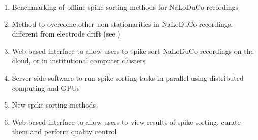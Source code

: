 \begin{enumerate}
    \item Benchmarking of offline spike sorting methods for NaLoDuCo recordings
    \item Method to overcome other non-stationarities in NaLoDuCo recordings, different from electrode drift (see )
    \item Web-based interface to allow users to spike sort NaLoDuCo recordings on the cloud, or in institutional computer clusters
    \item Server side software to run spike sorting tasks in parallel using distributed computing and GPUs
    \item New spike sorting methods
    \item Web-based interface to allow users to view results of spike sorting, curate them and perform quality control

\end{enumerate}


